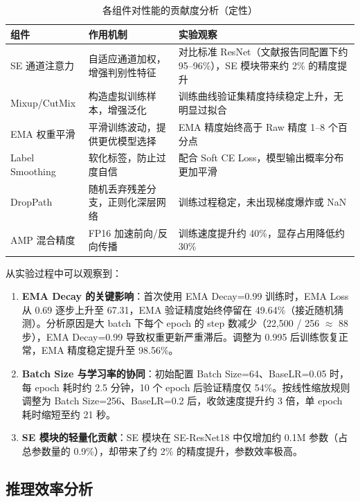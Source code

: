 \documentclass[12pt,a4paper]{ctexart}
\begin{document}
\begin{table}[H]
    \centering
    \caption{各组件对性能的贡献度分析（定性）}
    \label{tab:ablation}
    \begin{tabular}{p{3cm}p{4cm}p{4cm}}
        \toprule
        \textbf{组件} & \textbf{作用机制} & \textbf{实验观察} \\
        \midrule
        SE 通道注意力 & 自适应通道加权，增强判别性特征 & 对比标准 ResNet（文献报告同配置下约 95--96\%），SE 模块带来约 2\% 的精度提升 \\
        Mixup/CutMix & 构造虚拟训练样本，增强泛化 & 训练曲线验证集精度持续稳定上升，无明显过拟合 \\
        EMA 权重平滑 & 平滑训练波动，提供更优模型选择 & EMA 精度始终高于 Raw 精度 1--8 个百分点 \\
        Label Smoothing & 软化标签，防止过度自信 & 配合 Soft CE Loss，模型输出概率分布更加平滑 \\
        DropPath & 随机丢弃残差分支，正则化深层网络 & 训练过程稳定，未出现梯度爆炸或 NaN \\
        AMP 混合精度 & FP16 加速前向/反向传播 & 训练速度提升约 40\%，显存占用降低约 30\% \\
        \bottomrule
    \end{tabular}
\end{table}

从实验过程中可以观察到：
\begin{enumerate}
    \item \textbf{EMA Decay 的关键影响}：首次使用 EMA Decay=0.99 训练时，EMA Loss 从 0.69 逐步上升至 67.31，EMA 验证精度始终停留在 49.64\%（接近随机猜测）。分析原因是大 batch 下每个 epoch 的 step 数减少（22,500 / 256 $\approx$ 88 步），EMA Decay=0.99 导致权重更新严重滞后。调整为 0.995 后训练恢复正常，EMA 精度稳定提升至 98.56\%。
    \item \textbf{Batch Size 与学习率的协同}：初始配置 Batch Size=64、BaseLR=0.05 时，每 epoch 耗时约 2.5 分钟，10 个 epoch 后验证精度仅 54\%。按线性缩放规则调整为 Batch Size=256、BaseLR=0.2 后，收敛速度提升约 3 倍，单 epoch 耗时缩短至约 21 秒。
    \item \textbf{SE 模块的轻量化贡献}：SE 模块在 SE-ResNet18 中仅增加约 0.1M 参数（占总参数量的 0.9\%），却带来了约 2\% 的精度提升，参数效率极高。
\end{enumerate}

\subsection{推理效率分析}
\end{document}
